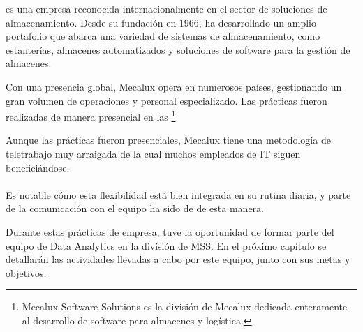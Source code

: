 

\href{https://www.mecalux.es/}{} es una empresa reconocida internacionalmente en el sector de soluciones de almacenamiento. Desde su fundación en 1966, ha desarrollado un amplio portafolio que abarca una variedad de sistemas de almacenamiento, como estanterías, almacenes automatizados y soluciones de software para la gestión de almacenes. 

Con una presencia global, Mecalux opera en numerosos países, gestionando un gran volumen de operaciones y personal especializado. Las prácticas fueron realizadas de manera presencial en las \href{https://maps.app.goo.gl/bJKvSNHAo5t1j4BZ6}{}\footnote{Mecalux Software Solutions es la división de Mecalux dedicada enteramente al desarrollo de software para almacenes y logística.}

\begin{notebox}
  Aunque las prácticas fueron presenciales, Mecalux tiene una metodología de teletrabajo muy arraigada de la cual muchos empleados de IT siguen beneficiándose. \\ \\
  Es notable cómo esta flexibilidad está bien integrada en su rutina diaria, y parte de la comunicación con el equipo ha sido de de esta manera.
\end{notebox}

Durante estas prácticas de empresa, tuve la oportunidad de formar parte del equipo de Data Analytics en la división de MSS. En el próximo capítulo se detallarán las actividades llevadas a cabo por este equipo, junto con sus metas y objetivos.

